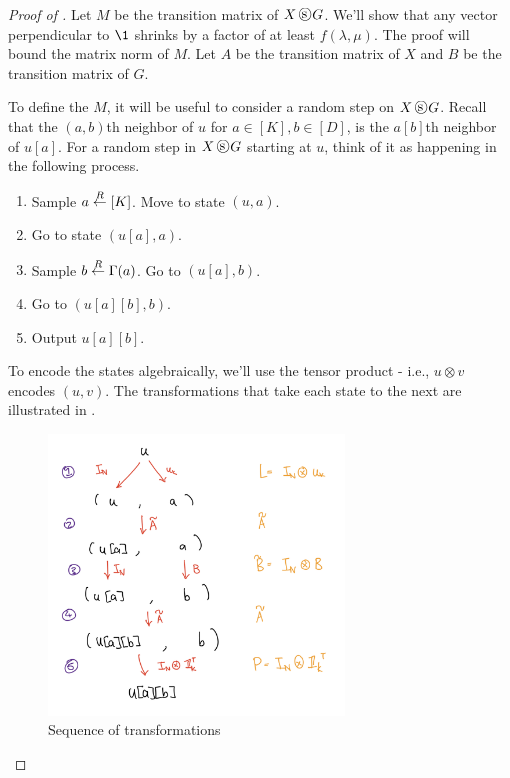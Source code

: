 \documentclass{article}
\begin{document}
\begin{proof}[Proof of ]
    Let $M$ be the transition matrix of $X\dsquare G$. We'll show that any vector perpendicular to $\1$ shrinks by a factor of at least $f(\lambda, \mu)$. The proof will bound the matrix norm of $M$. Let $A$ be the transition matrix of $X$ and $B$ be the transition matrix of $G$.

    To define the $M$, it will be useful to consider a random step on $X \dsquare G$. Recall that the $(a, b)$th neighbor of $u$ for $a \in [K], b \in [D]$, is the $a[b]$th neighbor of $u[a]$. For a random step in $X \dsquare G$ starting at $u$, think of it as happening in the following process.
    \begin{enumerate}
        \item Sample $a \overset{R}{\leftarrow} [K]$. Move to state $(u, a)$.
        \item Go to state $(u[a], a)$.
        \item Sample $b \overset{R}{\leftarrow} \Gamma(a)$. Go to $(u[a], b)$.
        \item Go to $(u[a][b], b)$.
        \item Output $u[a][b]$.
    \end{enumerate}


    To encode the states algebraically, we'll use the tensor product - i.e., $u \otimes v$ encodes $(u, v)$. The transformations that take each state to the next are illustrated in .

    \begin{figure}[ht]
        \begin{center}
            \includegraphics[width=0.7\textwidth]{equations.png}
        \end{center}
        \caption{Sequence of transformations} \label{fig:sequence}
    \end{figure}
    

\end{proof}
\end{document}
